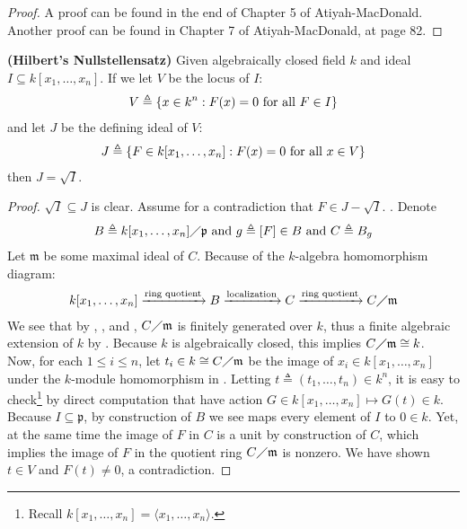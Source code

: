 \documentclass{report}
\begin{document}
\begin{proof}
A proof can be found in the end of Chapter 5 of Atiyah-MacDonald. Another proof can be found in Chapter 7 of Atiyah-MacDonald, at page 82.
\end{proof}
\begin{theorem}
\label{HN}
\textbf{(Hilbert's Nullstellensatz)} Given algebraically closed field $k$ and ideal  $I\subseteq k[x_1,\dots ,x_n]$. If we let $V$ be the locus of $I$: 
\begin{align*}
V\triangleq   \{ x\in k^n : F(x)=0\text{ for all }F \in I \}
\end{align*}
and let $J$ be the defining ideal of $V$: 
 \begin{align*}
J\triangleq  \{ F \in k[x_1,\dots ,x_n]: F(x)=0\text{ for all }x \in V \}
\end{align*}
then $J = \sqrt{I}$. 
\end{theorem}
\begin{proof}
  $\sqrt{I}\subseteq J$ is clear. Assume for a contradiction that $F \in J - \sqrt{I}$. . Denote 
\begin{align*}
B \triangleq k[x_1,\dots ,x_n]\diagup  \mathfrak{p} \text{ and }g\triangleq [F] \in B\text{ and }C\triangleq B_g
\end{align*}
Let $\mathfrak{m}$ be some maximal ideal of $C$. Because of the $k$-algebra homomorphism diagram: 
 \begin{align}
\label{kdm}
k[x_1,\dots ,x_n]\xrightarrow{\text{ring quotient}}  B\xrightarrow{\text{localization}} C\xrightarrow{\text{ring quotient}} C \diagup \mathfrak{m}
\end{align}
We see that  by  , , and ,  $C\diagup \mathfrak{m}$ is finitely generated over $k$, thus a finite algebraic extension of $k$ by  . Because $k$ is algebraically closed, this implies $C\diagup \mathfrak{m}\cong  k$. \\

Now, for each  $1\leq i\leq n$, let $t_i\in k\cong C\diagup \mathfrak{m}$ be the image of $x_i\in k[x_1,\dots ,x_n]$ under the $k$-module homomorphism in .  Letting $t\triangleq (t_1,\dots ,t_n)\in k^n$, it is easy to check\footnote{Recall $k[x_1,\dots ,x_n]=\langle x_1,\dots ,x_n\rangle $.} by direct computation that  have action $G \in k[x_1,\dots ,x_n]\mapsto G(t)\in k$. Because  $I \subseteq \mathfrak{p}$, by construction of $B$ we see  maps every element of $I$ to $0\in k$. Yet, at the same time the image of $F$ in $C$ is a unit by construction of  $C$, which implies the image of $F$ in the quotient ring $C\diagup \mathfrak{m}$ is nonzero. We have shown $t \in V$ and $F(t)\neq 0$, a contradiction. 
\end{proof}
\end{document}
